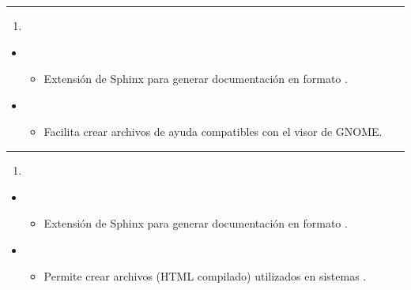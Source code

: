 \documentclass[a4paper,10pt,oneside,spanish,openany]{sphinxmanual}
\begin{document}
\bigskip\hrule\bigskip

\begin{enumerate}
%
\setcounter{enumi}{32}
\item {} 
\sphinxAtStartPar
{}

\end{enumerate}
\begin{itemize}
\item {} 
\sphinxAtStartPar
{}
\begin{itemize}
\item {} 
\sphinxAtStartPar
Extensión de Sphinx para generar documentación en formato .

\end{itemize}

\item {} 
\sphinxAtStartPar
{}
\begin{itemize}
\item {} 
\sphinxAtStartPar
Facilita crear archivos de ayuda compatibles con el visor  de GNOME.

\end{itemize}

\end{itemize}


\bigskip\hrule\bigskip

\begin{enumerate}
%
\setcounter{enumi}{33}
\item {} 
\sphinxAtStartPar
{}

\end{enumerate}
\begin{itemize}
\item {} 
\sphinxAtStartPar
{}
\begin{itemize}
\item {} 
\sphinxAtStartPar
Extensión de Sphinx para generar documentación en formato .

\end{itemize}

\item {} 
\sphinxAtStartPar
{}
\begin{itemize}
\item {} 
\sphinxAtStartPar
Permite crear archivos  (HTML compilado) utilizados en sistemas .

\end{itemize}

\end{itemize}
\end{document}
